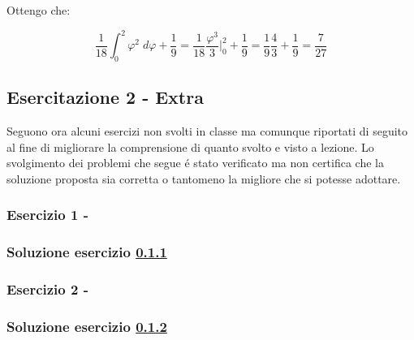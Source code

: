 \documentclass[../main.tex]{subfiles}
\begin{document}
Ottengo che:

\begin{equation}
	\frac{1}{18} \int_0^2 \varphi^2  \; d\varphi + \frac{1}{9} = \frac{1}{18} \frac{\varphi^3}{3} \bigg|_0^2 + \frac{1}{9} = \frac{1}{9} \frac{4}{3} + \frac{1}{9} = \frac{7}{27} 
\end{equation}




\vspace*{1.5cm}
\subsection{Esercitazione 2 - Extra}

Seguono ora alcuni esercizi non svolti in classe ma comunque riportati di seguito al fine di migliorare la comprensione di quanto svolto e visto a lezione.
Lo svolgimento dei problemi che segue é stato verificato ma non certifica che la soluzione proposta sia corretta o tantomeno la migliore che si potesse adottare.

\vspace*{1.5cm}
\subsubsection{Esercizio 1 - }
\label{extra21}


\subsubsection*{Soluzione esercizio \ref{extra21}}

\vspace*{1.5cm}
\subsubsection{Esercizio 2 - }
\label{extra22}


\subsubsection*{Soluzione esercizio \ref{extra22}}
\end{document}
